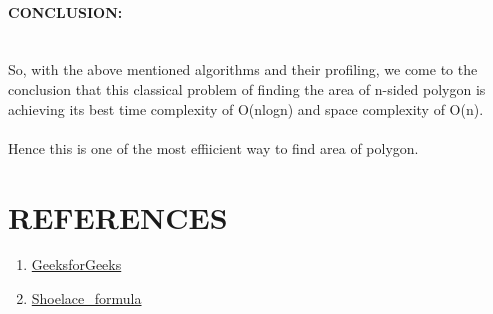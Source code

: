 \documentclass[10pt]{article}
\begin{document}
\begin{multicols*}{2}
\paragraph{CONCLUSION:} \\


So, with the above mentioned algorithms and their profiling, we come to the conclusion that this classical problem of finding the  area of n-sided polygon is achieving its best time complexity of O(nlogn) and space complexity of O(n).\\\\ Hence this is one of the most effiicient way to find area of polygon.

\section*{REFERENCES}


\begin{enumerate}
    
\item  \href{https://www.geeksforgeeks.org/multiply-two-polynomials-2/}{GeeksforGeeks}
\item  \href{https://en.wikipedia.org/wiki/Shoelace_formula}{Shoelace_formula}\\

\end{enumerate}\\

\end{multicols*}

\clearpage
\end{document}
